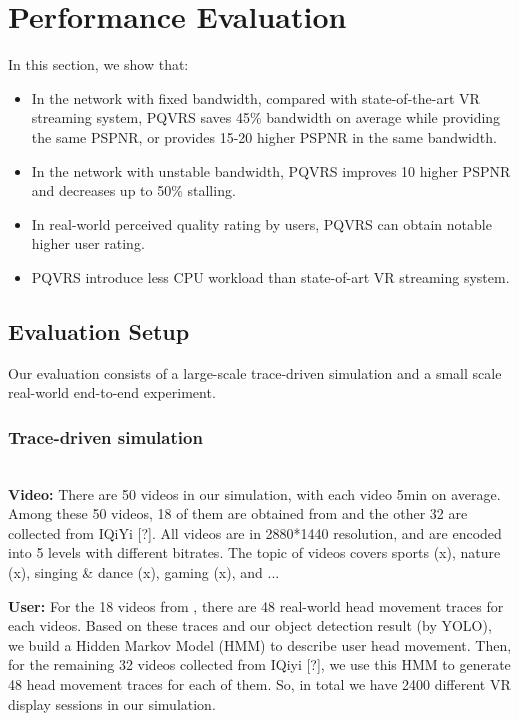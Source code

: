 \section{Performance Evaluation}

In this section, we show that:

\begin{itemize}

\item In the network with fixed bandwidth, compared with state-of-the-art VR streaming system, PQVRS saves 45\% bandwidth on average while providing the same PSPNR, or provides 15-20 higher PSPNR in the same bandwidth.

\item In the network with unstable bandwidth, PQVRS improves 10 higher PSPNR and decreases up to 50\% stalling.

\item In real-world perceived quality rating by users, PQVRS can obtain notable higher user rating.

\item PQVRS introduce less CPU workload than state-of-art VR streaming system.

\end{itemize}

\subsection{Evaluation Setup}

Our evaluation consists of a large-scale trace-driven simulation and a small scale real-world end-to-end experiment.

\subsubsection{Trace-driven simulation}
~\\

\textbf{Video: } There are 50 videos in our simulation, with each video 5min on average. Among these 50 videos, 18 of them are obtained from \cite{VRdataset} and the other 32 are collected from IQiYi [?]. All videos are in 2880*1440 resolution, and are encoded into 5 levels with different bitrates. The topic of videos covers sports (x), nature (x), singing \& dance (x), gaming (x), and ...

\textbf{User: } For the 18 videos from \cite{VRdataset}, there are 48 real-world head movement traces for each videos. Based on these traces and our object detection result (by YOLO), we build a Hidden Markov Model (HMM) to describe user head movement. Then, for the remaining 32 videos collected from IQiyi [?], we use this HMM to generate 48 head movement traces for each of them. So, in total we have 2400 different VR display sessions in our simulation.

